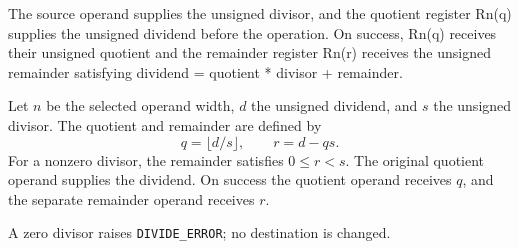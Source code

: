The source operand supplies the unsigned divisor, and the quotient register Rn(q) supplies the unsigned dividend before the operation. On success, Rn(q) receives their unsigned quotient and the remainder register Rn(r) receives the unsigned remainder satisfying dividend = quotient * divisor + remainder.

Let \(n\) be the selected operand width, \(d\) the unsigned dividend, and \(s\) the unsigned divisor. The quotient and remainder are defined by
\[
  q = \lfloor d/s \rfloor,
  \qquad r = d - qs .
\]
For a nonzero divisor, the remainder satisfies \(0 \le r < s\). The original quotient operand supplies the dividend. On success the quotient operand receives \(q\), and the separate remainder operand receives \(r\).

A zero divisor raises \texttt{DIVIDE\_ERROR}; no destination is changed.
